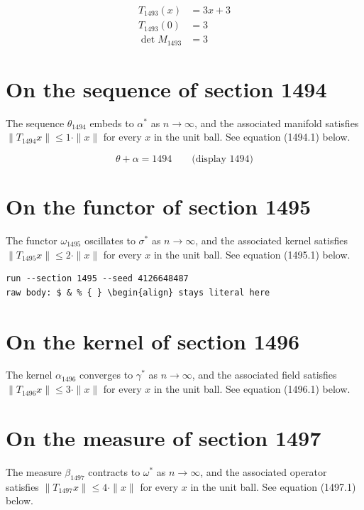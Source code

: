 \documentclass{article}
\begin{document}
\begin{align}
T_{1493}(x) &= 3 x + 3 \\
T_{1493}(0) &= 3 \\
\det M_{1493} &= 3
\end{align}

\section{On the sequence of section 1494}
The sequence $\theta_{1494}$ embeds to $\alpha^{*}$ as $n \to \infty$,
and the associated manifold satisfies $\|T_{1494} x\| \leq 1 \cdot \|x\|$
for every $x$ in the unit ball. See equation (1494.1) below.

$$
\theta + \alpha = 1494 \qquad \text{(display 1494)}
$$

\section{On the functor of section 1495}
The functor $\omega_{1495}$ oscillates to $\sigma^{*}$ as $n \to \infty$,
and the associated kernel satisfies $\|T_{1495} x\| \leq 2 \cdot \|x\|$
for every $x$ in the unit ball. See equation (1495.1) below.

\begin{verbatim}
run --section 1495 --seed 4126648487
raw body: $ & % { } \begin{align} stays literal here
\end{verbatim}

\section{On the kernel of section 1496}
The kernel $\alpha_{1496}$ converges to $\gamma^{*}$ as $n \to \infty$,
and the associated field satisfies $\|T_{1496} x\| \leq 3 \cdot \|x\|$
for every $x$ in the unit ball. See equation (1496.1) below.

\section{On the measure of section 1497}
The measure $\beta_{1497}$ contracts to $\omega^{*}$ as $n \to \infty$,
and the associated operator satisfies $\|T_{1497} x\| \leq 4 \cdot \|x\|$
for every $x$ in the unit ball. See equation (1497.1) below.
\end{document}
